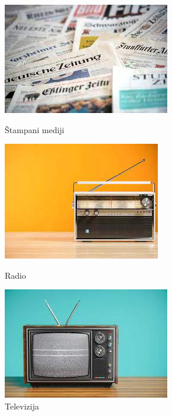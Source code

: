 \documentclass[a4paper]{article}
\begin{document}
\begin{figure}[!htb]
  \includegraphics[width=\linewidth]{slika 1.jpg}
  \caption{Štampani mediji}\label{fig:newspaper}
\endminipage\hfill
{}
  \includegraphics[width=\linewidth]{slika 2.jpg}
  \caption{Radio}\label{fig:radio}
\endminipage\hfill
{}%
  \includegraphics[width=\linewidth]{slika 3.jpg}
  \caption{Televizija}\label{fig:tv}
\endminipage
\end{figure}
\end{document}

